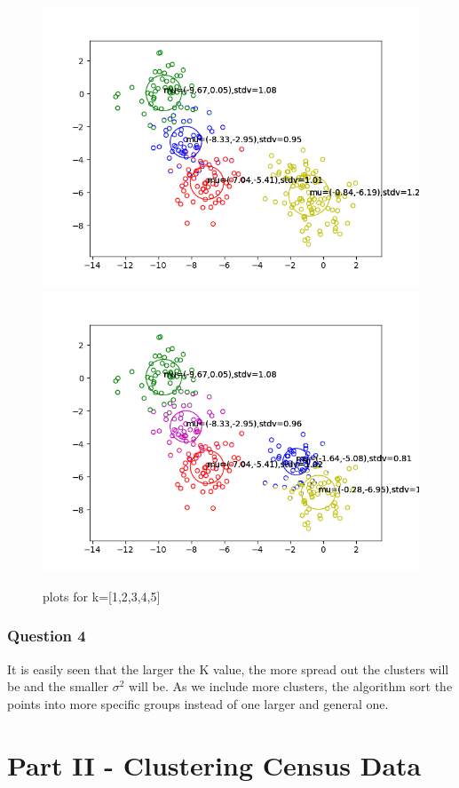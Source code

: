 \documentclass[letterpaper, 12pt]{article}
\begin{document}
\begin{figure}[h!]
    \includegraphics[scale=0.48]{14k4}
    \includegraphics[scale=0.48]{14k5}
    \caption {plots for k=[1,2,3,4,5]}
\end{figure}
\pagebreak
\section*{Question 4}


It is easily seen that the larger the K value, the more spread out the clusters will be and the smaller $\sigma^2$ will be. As we include more clusters, the algorithm sort the points into more specific groups instead of one larger and general one.


\pagebreak
\part*{Part II - Clustering Census Data}
\vspace{8mm}
\end{document}
